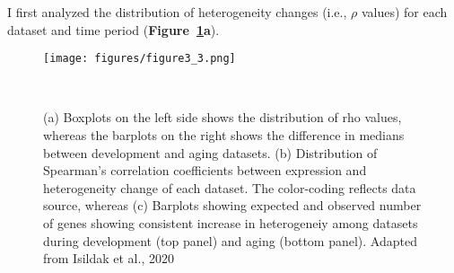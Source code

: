 I first analyzed the distribution of heterogeneity changes (i.e., $\rho$ values) for each dataset and time period (\textbf{Figure~\ref{fig:fig3.3}a}).

\begin{figure}[h]
    \centering
    \texttt{[image: figures/figure3\_3.png]}
    \caption{(a) Boxplots on the left side shows the distribution of rho values, 
    whereas the barplots on the right shows the difference in medians between development and aging datasets.
    (b) Distribution of Spearman's correlation coefficients between expression and heterogeneity change of each dataset. 
    The color-coding reflects data source, whereas 
    (c) Barplots showing expected and observed number of genes showing consistent increase in heterogeneiy among datasets during development (top panel) and aging (bottom panel).
    Adapted from Isildak et al., 2020
    }~\label{fig:fig3.3}
\end{figure}
